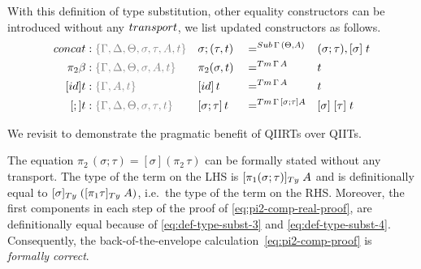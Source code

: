 \documentclass[a4paper,UKenglish,numberwithinsect,cleveref,thm-restate]{lipics-v2021}
\begin{document}
With this definition of type substitution, other equality constructors can be introduced without any $\transp$, we list updated constructors as follows.
\begin{alignat*}{5}
  \mathsf{concat} & : \implicit{\Gamma, \Delta, \Theta, \sigma, \tau, A, t} &&\sigma ; (\tau , t) && =^{\Sub\,\Gamma\,(\Theta, A)} &&  (\sigma ; \tau), [ \sigma ]\;t \\
  \pi_2\beta      & : \implicit{\Gamma, \Delta, \Theta, \sigma, A, t} && \pi_2(\sigma , t)        && =^{\Tm\,\Gamma\, A} &&  t \\
  [\idS]t         & : \implicit{\Gamma, A, t} && {[\idS]\,t}          && =^{\Tm\,\Gamma\,A} && t \\
  [;]t            & : \implicit{\Gamma, \Delta, \Theta, \sigma, \tau, t} && {[\sigma ; \tau]\,t} && =^{\Tm\,\Gamma\,[\sigma ; \tau] A} && {[ \sigma ]\;[ \tau ]\;t}
\end{alignat*}

We revisit  to demonstrate the pragmatic benefit of QIIRTs over QIITs.
\begin{example}
  The equation $\pi_2\,(\sigma; \tau) = [\sigma](\pi_2\,\tau)$ can be formally stated without any transport.
  The type of the term on the LHS is $[\pi_1(\sigma;\tau)]_{\Ty}\;A$ and is definitionally equal to $[\sigma]_\Ty\;([\pi_1\tau]_\Ty\;A)$, i.e.\ the type of the term on the RHS.
  Moreover, the first components in each step of the proof of \eqref{eq:pi2-comp-real-proof}, are definitionally equal because of \eqref{eq:def-type-subst-3} and \eqref{eq:def-type-subst-4}.
  Consequently, the back-of-the-envelope calculation~\eqref{eq:pi2-comp-proof} is \emph{formally correct}.
\end{example}
\end{document}
